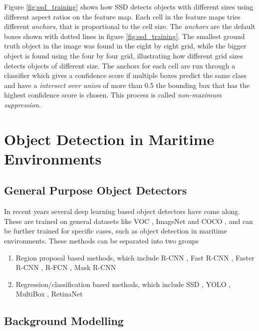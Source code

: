 Figure \ref{fig:ssd_training} shows how SSD detects objects with different sizes using different aspect ratios on the feature map. Each cell in the feature maps tries different \textit{anchors}, that is proportional to the cell size. The \textit{anchors} are the default boxes shown with dotted lines in figure \ref{fig:ssd_training}. The smallest ground truth object in the image was found in the eight by eight grid, while the bigger object is found using the four by four grid, illustrating how different grid sizes detects objects of different size. The anchors for each cell are run through a classifier which gives a confidence score if multiple boxes predict the same class and have a \textit{intersect over union} of more than 0.5 the bounding box that has the highest confidence score is chosen. This process is called \textit{non-maximum suppression}.


\section{Object Detection in Maritime Environments}
\label{sec:obj_det}


\subsection{General Purpose Object Detectors}
In recent years several deep learning based object detectors have come along. These are trained on general datasets like VOC \citep{Everingham2012}\citep{Everingham2007}, ImageNet \citep{Imagenet} and COCO \citep{COCO},  and can be further trained for specific cases, such as object detection in maritime environments. These methods can be separated into two groups 

\begin{enumerate}
\item Region proposal based methods, which include R-CNN \citep{R-CNN}, Fast R-CNN \citep{FastR-CNN}, Faster R-CNN \citep{FasterR-CNN}, R-FCN \citep{R-FCN}, Mask R-CNN \citep{MaskRCNN}
\item Regression/classification based methods, which include SSD \citep{SSD}, YOLO \citep{YOLOv1} \citep{YOLOv2} \citep{YOLOv3}, MultiBox \citep{Multibox}, RetinaNet \citep{Retinanet}
\end{enumerate}




\subsection{Background Modelling}

